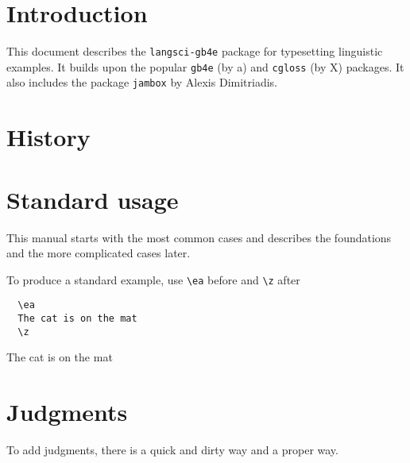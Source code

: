 \documentclass[output=paper]{langscibook}
\newcommand{\cmd}[1]{\texttt{\textbackslash#1}}
\begin{document}

%
%
%
%
%
%
%

\section{Introduction}
This document describes the \texttt{langsci-gb4e} package for typesetting linguistic examples. It builds upon the popular \texttt{gb4e} (by a) and \texttt{cgloss} (by X) packages. It also includes the package \texttt{jambox} by Alexis Dimitriadis. 
\section{History}
\section{Standard usage}
This manual starts with the most common cases and describes the foundations and the more complicated cases later. 

To produce a standard example, use \cmd{ea} before and \cmd{z} after
 
\begin{minipage}{.45\textwidth}
\begin{lstlisting}
  \ea 
  The cat is on the mat
  \z
\end{lstlisting}
\end{minipage}
\parbox[b]{.45\textwidth}{
  \ea 
  The cat is on the mat
  \z
  }

\section{Judgments}  
  To add judgments, there is a quick and dirty way and a proper way. 
\end{document}
